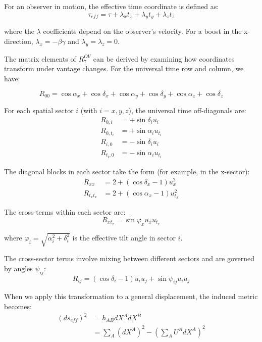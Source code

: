 \documentclass{article}
\begin{document}
For an observer in motion, the effective time coordinate is defined as:
\begin{equation}
\tau_{eff} = \tau + \lambda_x t_x + \lambda_y t_y + \lambda_z t_z
\end{equation}

where the $\lambda$ coefficients depend on the observer's velocity. For a boost in the x-direction, $\lambda_x = -\beta\gamma$ and $\lambda_y = \lambda_z = 0$.

The matrix elements of $R^{OV}_7$ can be derived by examining how coordinates transform under vantage changes. For the universal time row and column, we have:

\begin{equation}
R_{00} = \cos\alpha_x + \cos\delta_x + \cos\alpha_y + \cos\delta_y + \cos\alpha_z + \cos\delta_z
\end{equation}

For each spatial sector $i$ (with $i = x, y, z$), the universal time off-diagonals are:
\begin{align}
R_{0,i} &= +\sin\delta_i u_i \\
R_{0,t_i} &= +\sin\alpha_i u_{t_i} \\
R_{i,0} &= -\sin\delta_i u_i \\
R_{t_i,0} &= -\sin\alpha_i u_{t_i}
\end{align}

The diagonal blocks in each sector take the form (for example, in the x-sector):
\begin{align}
R_{xx} &= 2 + (\cos\delta_x - 1)u_x^2 \\
R_{t_x t_x} &= 2 + (\cos\alpha_x - 1)u_{t_x}^2
\end{align}

The cross-terms within each sector are:
\begin{equation}
R_{x t_x} = \sin\varphi_x u_x u_{t_x}
\end{equation}

where $\varphi_i = \sqrt{\alpha_i^2 + \delta_i^2}$ is the effective tilt angle in sector $i$.

The cross-sector terms involve mixing between different sectors and are governed by angles $\psi_{ij}$:
\begin{equation}
R_{ij} = (\cos\delta_i - 1)u_i u_j + \sin\psi_{ij} u_i u_j
\end{equation}

When we apply this transformation to a general displacement, the induced metric becomes:
\begin{align}
(ds_{eff})^2 &= h_{AB} dX^A dX^B \\
&= \sum_A (dX^A)^2 - (\sum_A U^A dX^A)^2
\end{align}
\end{document}
